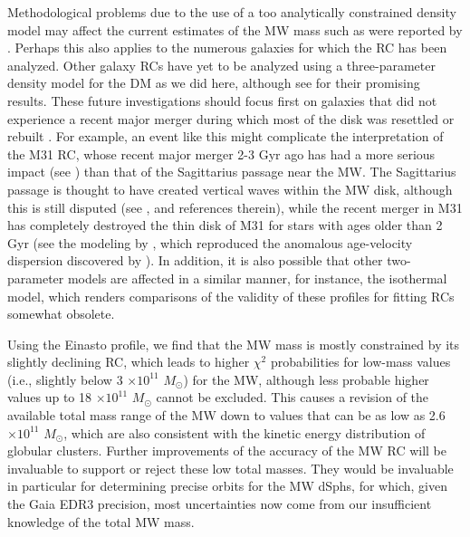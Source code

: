 \documentclass{aa}
\begin{document}
 Methodological problems due to the use of a too analytically constrained density model may affect the current estimates of the MW mass such as were reported by \citet{Eilers2019}. Perhaps this also applies to the numerous galaxies for which the RC has been analyzed. Other galaxy RCs have yet to be analyzed using a three-parameter density model for the DM as we did here, although see \cite{Chemin2011} for their promising results. These future investigations should focus first on galaxies that did not experience a recent major merger during which most of the disk was resettled or rebuilt \citep{Hammer2005,Hammer2009,Hopkins2009}. For example, an event like this might complicate the interpretation of the M31 RC, whose recent major merger 2-3 Gyr ago has had a more serious impact (see \citealt{Hammer2018}) than that of the Sagittarius passage near the MW. The Sagittarius passage is thought to have created vertical waves within the MW disk, although this is still disputed (see \citealt{Bennett2020}, and references therein), while the recent merger in M31 has completely destroyed the thin disk of M31 for stars with ages older than 2 Gyr (see the modeling by \citealt{Hammer2018}, which reproduced the anomalous age-velocity dispersion discovered by \citealt{Dorman2015}).  In addition, it is also possible that other two-parameter models are affected in a similar manner, for instance, the isothermal model, which renders comparisons of the validity of these profiles for fitting RCs somewhat obsolete.

Using the Einasto profile, we find that the  MW mass is mostly constrained by its slightly declining RC, which leads to higher $\chi^2$ probabilities for low-mass values (i.e., slightly below 3 $\times 10^{11}$ $M_{\odot}$) for the MW, although less probable higher values up to 18 $\times 10^{11}$ $M_{\odot}$ cannot be excluded. This causes a revision of the available total mass range of the MW down to values that can be as low as 2.6 $\times 10^{11}$ $M_{\odot}$, which are also consistent with the kinetic energy distribution of globular clusters. Further improvements of the accuracy of the MW RC will be invaluable to support or reject these low total masses. They would be invaluable in particular for determining precise orbits for the MW dSphs, for which, given the Gaia EDR3 precision, most uncertainties now come from our insufficient knowledge of the total MW mass.

 
\end{document}

